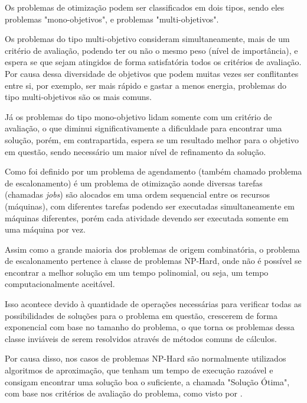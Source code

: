 Os problemas de otimização podem ser classificados em dois tipos, sendo eles problemas "mono-objetivos", e problemas "multi-objetivos".


\indent Os problemas do tipo multi-objetivo consideram simultaneamente, mais de um critério de avaliação, podendo ter ou não o mesmo peso (nível de importância), e espera se que sejam atingidos de forma satisfatória todos os critérios de avaliação. Por causa dessa diversidade de objetivos que podem muitas vezes ser conflitantes entre si, por exemplo, ser mais rápido e gastar a menos energia, problemas do tipo multi-objetivos são os mais comuns.


\indent Já os problemas do tipo mono-objetivo lidam somente com um critério de avaliação, o que diminui significativamente a dificuldade para encontrar uma solução, porém, em contrapartida, espera se um resultado melhor para o objetivo em questão, sendo necessário um maior nível de refinamento da solução.


Como foi definido por \citeauthor{Bagchi1999} um problema de agendamento (também chamado problema de escalonamento) é um problema de otimização aonde 
diversas tarefas (chamadas \textit{jobs}) são alocados em uma ordem sequencial entre os recursos (máquinas), 
com diferentes tarefas podendo ser executadas simultaneamente em máquinas diferentes, porém cada atividade devendo ser executada somente em uma máquina por vez.


Assim como a grande maioria dos problemas de origem combinatória, o problema de escalonamento pertence à classe de problemas NP-Hard, onde não é possível se encontrar a melhor solução em um tempo polinomial, ou seja, um tempo computacionalmente aceitável.


\indent Isso acontece devido à quantidade de operações necessárias para verificar todas as possibilidades de soluções para o problema em questão, crescerem de forma exponencial com base no tamanho do problema,
o que torna os problemas dessa classe inviáveis de serem resolvidos através de métodos comuns de cálculos.


\indent Por causa disso, nos casos de problemas NP-Hard são normalmente utilizados algoritmos de aproximação, que tenham um tempo de execução razoável e consigam encontrar uma solução boa o suficiente, a chamada "Solução Ótima",  com base nos critérios de avaliação do problema, como visto por \cite{lawler1993}.



